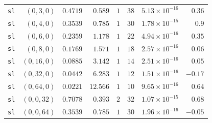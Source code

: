 \begin{longtable}{lrrrrrrr}
\texttt{sl} & $(0,3,0)$ & $0.4719$ & $0.589$ & $1$ & $38$ & $5.13{\times}10^{-16}$ & $0.36$ \\
\texttt{sl} & $(0,4,0)$ & $0.3539$ & $0.785$ & $1$ & $30$ & $1.78{\times}10^{-15}$ & $0.9$ \\
\texttt{sl} & $(0,6,0)$ & $0.2359$ & $1.178$ & $1$ & $22$ & $4.94{\times}10^{-16}$ & $0.35$ \\
\texttt{sl} & $(0,8,0)$ & $0.1769$ & $1.571$ & $1$ & $18$ & $2.57{\times}10^{-16}$ & $0.06$ \\
\texttt{sl} & $(0,16,0)$ & $0.0885$ & $3.142$ & $1$ & $14$ & $2.51{\times}10^{-16}$ & $0.05$ \\
\texttt{sl} & $(0,32,0)$ & $0.0442$ & $6.283$ & $1$ & $12$ & $1.51{\times}10^{-16}$ & $-0.17$ \\
\texttt{sl} & $(0,64,0)$ & $0.0221$ & $12.566$ & $1$ & $10$ & $9.65{\times}10^{-16}$ & $0.64$ \\
\texttt{sl} & $(0,0,32)$ & $0.7078$ & $0.393$ & $2$ & $32$ & $1.07{\times}10^{-15}$ & $0.68$ \\
\texttt{sl} & $(0,0,64)$ & $0.3539$ & $0.785$ & $1$ & $30$ & $1.96{\times}10^{-16}$ & $-0.05$ \\
\end{longtable}
